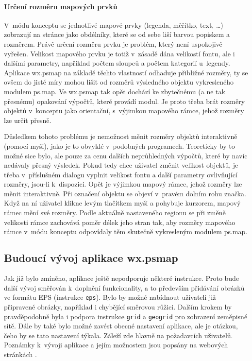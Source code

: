 \documentclass[a4paper,12pt,draft]{article}
\newcommand{\instr}[1]{\lstinline[style=psmapInline]|#1|}
\begin{document}
 \paragraph*{Určení rozměru mapových prvků}
 V~módu konceptu se jednotlivé mapové prvky (legenda, měřítko, text, \ldots)
zobrazují na
 stránce jako obdélníky, které se od sebe liší barvou popiskem
 a rozměrem. Právě určení rozměru prvku je problém, který není
 uspokojivě vyřešen. Velikost mapového prvku je totiž v~zásadě dána
 velikostí fontu, ale i dalšími parametry, například počtem sloupců
 a počtem kategorií u~legendy. Aplikace wx.psmap na základě těchto
 vlastností odhaduje přibližné rozměry, ty se ovšem do jisté míry
 mohou lišit od rozměrů výsledného objektu vykresleného modulem
 ps.map. Ve wx.psmap tak opět dochází ke zbytečnému (a ne
 tak přesnému) opakování výpočtů, které provádí modul. Je proto třeba brát
 rozměry objektů v~konceptu  jako orientační, s~výjimkou
 mapového rámce, jehož rozměry lze určit přesně.

 Důsledkem tohoto problému je nemožnost měnit rozměry objektů
 interaktivně (pomocí myši), jako je to obvyklé v~podobných
 programech. Teoreticky by to možné sice bylo, ale pouze za cenu
 dalších neprůhledných výpočtů, které by navíc nedávaly přesný
 výsledek. Pokud tedy chce uživatel změnit velikost objektů, je třeba
 v~přísluš\-ném dialogu vyplnit velikost fontu a další parametry
 ovlivňující rozměry, jsou-li k~dispozici. Opět je výjimkou mapový
 rámec, jehož rozměry lze měnit interaktivně. Při označení objektu
 se objeví v~pravém dolním rohu značka. Když na ní uživatel klikne levým
tlačítkem myši a pohybuje kurzorem, mapový rámec mění své rozměry. Podle
aktuálně nastaveného regionu se při změně velikosti rámce zachovává poměr délek
jeho stran tak, aby rozměry mapového rámce v~módu konceptu odpovídaly těm
skutečně vykresleným modulem ps.map.


\subsection{Budoucí vývoj aplikace wx.psmap}
\label{sec:gui:future}
Jak již bylo zmíněno, aplikace ještě nepodporuje některé  instrukce.
Proto bude další vývoj směřován k~doplnění funkcionality, a to především
přidávání obrá\-zků ve formátu EPS (instrukce \instr{eps}). Bylo by možné
nabídnout uživateli již připra\-vené obrázky, například i chybějící
směrovou růžici. Dalším krokem by pravděpo\-dobně byla i podpora instrukce
\instr{grid} a \instr{geogrid} pro zobrazení zeměpisné sítě.
Dále by také bylo možné zavést obecné nastavení aplikace, ale je otázkou, čeho
by se tato nastavení týkala. Záleží zde hlavně na požadavcích uživatelů.
Poznámky k~vývoji aplikace a jejím možnostem jsou popsány na webových stránkách
\cite{trac_wxpsmap}.
\end{document}
